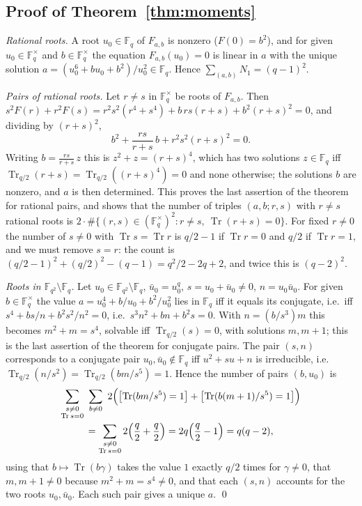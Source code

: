 ﻿\documentclass[12pt,a4paper]{amsart}
\theoremstyle{definition}
\newcommand{\F}{\mathbb{F}}
\newcommand{\Tr}{\operatorname{Tr}}
\begin{document}
\subsection{Proof of Theorem~\ref{thm:moments}}
\emph{Rational roots.} A root $u_0\in\F_q$ of $F_{a,b}$ is nonzero ($F(0)=b^2$), and for given $u_0\in\F_q^\times$ and $b\in\F_q^\times$ the equation $F_{a,b}(u_0)=0$ is linear in $a$ with the unique solution $a=(u_0^6+bu_0+b^2)/u_0^2\in\F_q$. Hence $\sum_{(a,b)}N_1=(q-1)^2$.

\emph{Pairs of rational roots.} Let $r\ne s$ in $\F_q^\times$ be roots of $F_{a,b}$. Then $s^2F(r)+r^2F(s)=r^2s^2(r^4+s^4)+b\,rs(r+s)+b^2(r+s)^2=0$, and dividing by $(r+s)^2$,
\[
b^2+\frac{rs}{r+s}\,b+r^2s^2(r+s)^2=0 .
\]
Writing $b=\frac{rs}{r+s}\,z$ this is $z^2+z=(r+s)^4$, which has two solutions $z\in\F_q$ iff $\Tr_{q/2}(r+s)=\Tr_{q/2}((r+s)^4)=0$ and none otherwise; the solutions $b$ are nonzero, and $a$ is then determined. This proves the last assertion of the theorem for rational pairs, and shows that the number of triples $(a,b;r,s)$ with $r\ne s$ rational roots is $2\cdot\#\{(r,s)\in(\F_q^\times)^2:r\ne s,\ \Tr(r+s)=0\}$. For fixed $r\ne0$ the number of $s\ne0$ with $\Tr s=\Tr r$ is $q/2-1$ if $\Tr r=0$ and $q/2$ if $\Tr r=1$, and we must remove $s=r$: the count is $(q/2-1)^2+(q/2)^2-(q-1)=q^2/2-2q+2$, and twice this is $(q-2)^2$.

\emph{Roots in $\F_{q^2}\setminus\F_q$.} Let $u_0\in\F_{q^2}\setminus\F_q$, $\bar u_0=u_0^q$, $s=u_0+\bar u_0\ne0$, $n=u_0\bar u_0$. For given $b\in\F_q^\times$ the value $a=u_0^4+b/u_0+b^2/u_0^2$ lies in $\F_q$ iff it equals its conjugate, i.e.\ iff $s^4+bs/n+b^2s^2/n^2=0$, i.e.\ $s^3n^2+bn+b^2s=0$. With $n=(b/s^3)m$ this becomes $m^2+m=s^4$, solvable iff $\Tr_{q/2}(s)=0$, with solutions $m,m+1$; this is the last assertion of the theorem for conjugate pairs. The pair $(s,n)$ corresponds to a conjugate pair $u_0,\bar u_0\notin\F_q$ iff $u^2+su+n$ is irreducible, i.e.\ $\Tr_{q/2}(n/s^2)=\Tr_{q/2}(bm/s^5)=1$. Hence the number of pairs $(b,u_0)$ is
\begin{multline*}
\sum_{\substack{s\ne0\\ \Tr s=0}}\ \sum_{b\ne0}\ 2\Bigl(\bigl[\Tr(bm/s^5)=1\bigr]+\bigl[\Tr(b(m+1)/s^5)=1\bigr]\Bigr)\\
=\sum_{\substack{s\ne0\\ \Tr s=0}}2\Bigl(\frac q2+\frac q2\Bigr)=2q\Bigl(\frac q2-1\Bigr)=q(q-2),
\end{multline*}
using that $b\mapsto\Tr(b\gamma)$ takes the value $1$ exactly $q/2$ times for $\gamma\ne0$, that $m,m+1\ne0$ because $m^2+m=s^4\ne0$, and that each $(s,n)$ accounts for the two roots $u_0,\bar u_0$. Each such pair gives a unique $a$. \qed
\end{document}
